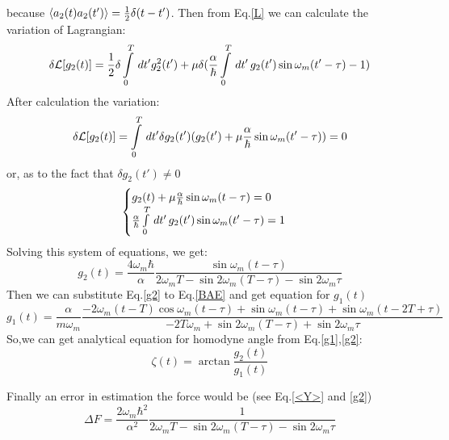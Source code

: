 because $\langle a_2(t)a_2(t')\rangle=\frac{1}{2}\delta(t-t')$.
Then from Eq.\ref{L} we can calculate the variation of Lagrangian:
\begin{equation}
 \delta\mathcal{L}[g_2(t)] = \frac{1}{2}\delta\int\limits_{0}^{T}\,dt'g_2^2(t') + \mu \delta(\frac{\alpha}{\hbar}\int\limits_{0}^{T}\,dt'\,g_2(t')\sin\omega_m(t'-\tau) - 1)
\end{equation}
After calculation the variation:
\begin{equation}
 \delta\mathcal{L}[g_2(t)] = \int\limits_{0}^{T}\,dt'\delta g_2(t')(g_2(t') + \mu \frac{\alpha}{\hbar}\sin\omega_m(t'-\tau)) = 0
\end{equation}
or, as to the fact that $\delta g_2(t') \neq 0$
\begin{equation}
\begin{cases}
 g_2(t) + \mu \frac{\alpha}{\hbar}\sin\omega_m(t-\tau) = 0\\
\frac{\alpha}{\hbar}\int\limits_{0}^{T}\,dt'\,g_2(t')\sin\omega_m(t'-\tau) = 1
\end{cases}
\end{equation}
Solving this system of equations, we get:
\begin{equation}\label{g2}
 g_2(t) = \frac{4\omega_m\hbar}{\alpha} \frac{\sin\omega_m(t-\tau)}{2\omega_mT-\sin2\omega_m(T-\tau)-\sin2\omega_m\tau}
\end{equation}
Then we can substitute Eq.\ref{g2} to Eq.\ref{BAE} and get equation for $g_1(t)$
\begin{equation}\label{g1}
 g_1(t) = \frac{\alpha}{m \omega_m} \frac{-2\omega_m(t-T)\cos\omega_m(t-\tau) + \sin\omega_m(t-\tau) + \sin\omega_m(t-2T+\tau)}{-2T\omega_m + \sin2\omega_m(T-\tau)+\sin2\omega_m\tau}
\end{equation}
So,we can get analytical equation for homodyne angle from Eq.\ref{g1},\ref{g2}:
\begin{equation}\label{appx:zeta}
 \zeta(t) = \arctan\frac{g_2(t)}{g_1(t)}
\end{equation}

Finally an error in estimation the force would be (see Eq.\ref{<Y>} and \ref{g2})
\begin{equation}
 \Delta F = \frac{2\omega_m\hbar^2}{\alpha^2} \frac{1}{2\omega_mT-\sin2\omega_m(T-\tau)-\sin2\omega_m\tau}
\end{equation}